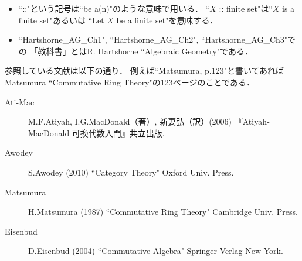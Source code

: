 \documentclass[a4paper]{jsarticle}
\begin{document}
\begin{itemize}
    \item
        ``::"という記号は``be a(n)"のような意味で用いる．
        ``$X$ :: finite set"は``$X$ is a finite set"あるいは
        ``Let $X$ be a finite set"を意味する．

    \item
        ``Hartshorne\_AG\_Ch1", ``Hartshorne\_AG\_Ch2", ``Hartshorne\_AG\_Ch3"での
        「教科書」とはR. Hartshorne ``Algebraic Geometry"である．
\end{itemize}

参照している文献は以下の通り．
例えば``Matsumura, p.123"と書いてあれば
Matsumura ``Commutative Ring Theory"の123ページのことである．
\begin{description}
    \item[Ati-Mac]
        M.F.Atiyah, I.G.MacDonald（著）, 新妻弘（訳）(2006)
        『Atiyah‐MacDonald 可換代数入門』共立出版.
    \item[Awodey]
        S.Awodey (2010)
        ``Category Theory" Oxford Univ. Press.
    \item[Matsumura]
        H.Matsumura (1987)
        ``Commutative Ring Theory" Cambridge Univ. Press.
    \item[Eisenbud]
        D.Eisenbud (2004)
        ``Commutative Algebra" Springer-Verlag New York.
\end{description}
\end{document}
